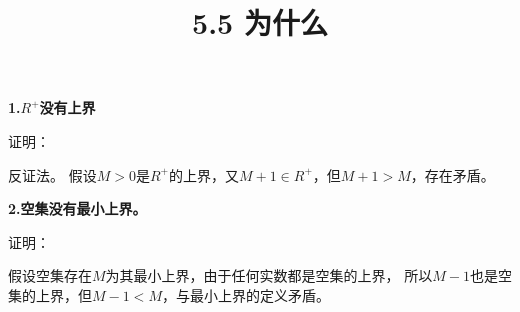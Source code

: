 \documentclass{article}
\theoremstyle{mystyle}
\begin{document}
\title{5.5 为什么}
\maketitle


\textbf{1.$R^{+}$没有上界}

证明：

反证法。
假设$M>0$是$R^{+}$的上界，又$M + 1 \in R^+$，但$M + 1 > M$，存在矛盾。

\textbf{2.空集没有最小上界。}

证明：

假设空集存在$M$为其最小上界，由于任何实数都是空集的上界，
所以$M - 1$也是空集的上界，但$M - 1 < M$，与最小上界的定义矛盾。
\end{document}
